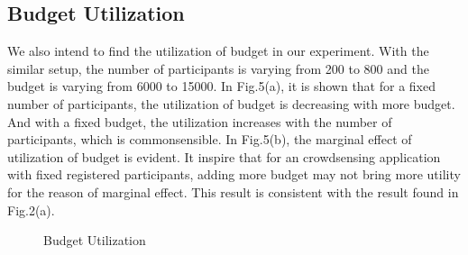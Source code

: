 \documentclass[10pt,journal,letterpaper,compsoc]{IEEEtran}
\begin{document}
\subsection{Budget Utilization}
We also intend to find the utilization of budget in our experiment. With the similar setup, the number of participants is varying from 200 to 800 and the budget is varying from 6000 to 15000. In Fig.5(a), it is shown that for a fixed number of participants, the utilization of budget is decreasing with more budget. And with a fixed budget, the utilization increases with the number of participants, which is commonsensible. In Fig.5(b), the marginal effect of utilization of budget is evident. It inspire that for an crowdsensing application with fixed registered participants, adding more budget may not bring more utility for the reason of marginal effect. This result is consistent with the result found in Fig.2(a).
\begin{figure}[!t]
  \centering
  \vspace{-0.2cm}
  \caption{Budget Utilization}
  \vspace{-0.2cm}
\end{figure}
\end{document}
